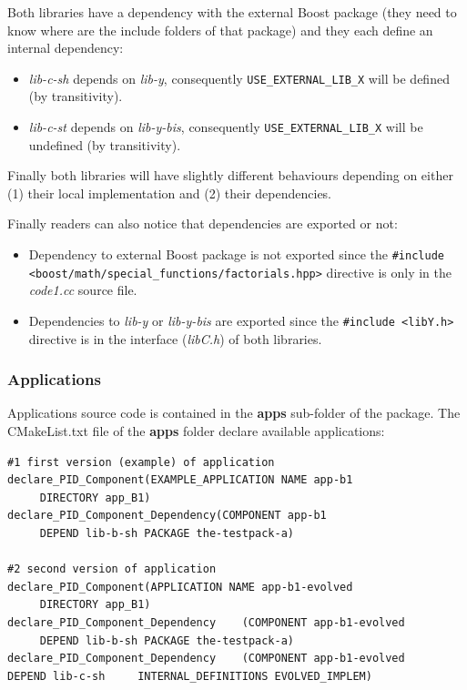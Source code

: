 \documentclass[12pt,a4paper]{article}
\begin{document}
Both libraries have a dependency with the external Boost package (they need to know where are the include folders of that package) and they each define an internal dependency:
\begin{itemize}
\item \textit{lib-c-sh} depends on \textit{lib-y}, consequently \texttt{USE\_EXTERNAL\_LIB\_X} will be defined (by transitivity).
\item \textit{lib-c-st} depends on \textit{lib-y-bis}, consequently \texttt{USE\_EXTERNAL\_LIB\_X} will be undefined (by transitivity).
\end{itemize}
Finally both libraries will have slightly different behaviours depending on either (1) their local implementation and (2) their dependencies.

Finally readers can also notice that dependencies are exported or not:
\begin{itemize}
\item Dependency to external Boost package is not exported since the \texttt{\#include <boost/math/special\_functions/factorials.hpp>} directive is only in the \textit{code1.cc} source file.
\item Dependencies to \textit{lib-y} or \textit{lib-y-bis} are exported since the \texttt{\#include <libY.h>} directive is in the interface (\textit{libC.h}) of both libraries.
\end{itemize}

\subsubsection{Applications}

Applications source code is contained in the \textbf{apps} sub-folder of the package. The CMakeList.txt file of the \textbf{apps} folder declare available applications:

\begin{verbatim}
#1 first version (example) of application
declare_PID_Component(EXAMPLE_APPLICATION NAME app-b1 
     DIRECTORY app_B1)
declare_PID_Component_Dependency(COMPONENT app-b1 
     DEPEND lib-b-sh PACKAGE the-testpack-a)

#2 second version of application
declare_PID_Component(APPLICATION NAME app-b1-evolved 
     DIRECTORY app_B1)
declare_PID_Component_Dependency	(COMPONENT app-b1-evolved 
     DEPEND lib-b-sh PACKAGE the-testpack-a)
declare_PID_Component_Dependency	(COMPONENT app-b1-evolved
DEPEND lib-c-sh 	INTERNAL_DEFINITIONS EVOLVED_IMPLEM)
\end{verbatim}
\end{document}

